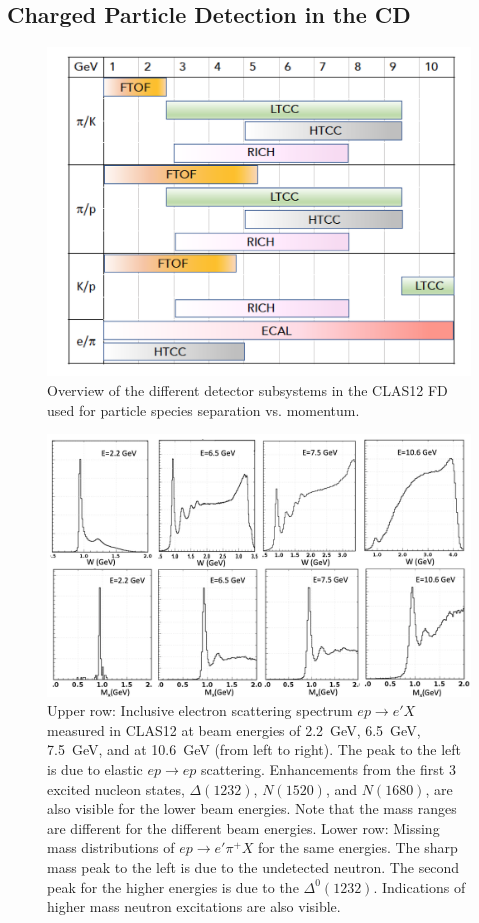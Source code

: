 \documentclass[final,3p,twocolumn]{elsarticle}
\begin{document}
\subsection{Charged Particle Detection in the CD} 
\begin{figure}[bhtp!]
\centerline{\includegraphics[width=1.0\columnwidth]{CLAS12-pid.png}}
\caption{Overview of the different detector subsystems in the CLAS12 FD used for particle species separation
  vs. momentum.}
\label{pid1}
\end{figure} 

\begin{figure}[t!]
\centerline{\includegraphics[width=2.0\columnwidth]{W-spectrum.png}}
\caption{Upper row: Inclusive electron scattering spectrum $ep \to e' X$ measured in CLAS12 at beam energies 
  of 2.2~GeV, 6.5~GeV, 7.5~GeV, and at 10.6~GeV (from left to right). The peak to the left is due to elastic
  $ep \to ep$ scattering. Enhancements from the first 3 excited nucleon states, $\Delta(1232)$, $N(1520)$,
  and $N(1680)$, are also visible for the lower beam energies. Note that the mass ranges  are different for the
  different beam energies. Lower row: Missing mass distributions of $ep\to e' \pi^+X$ for the same energies. The
  sharp mass peak to the left is due to the undetected neutron. The second peak for the higher energies is due to
  the $\Delta^0(1232)$. Indications of higher mass neutron excitations are also visible.} 
\label{spectrum}
\end{figure} 
\end{document}
